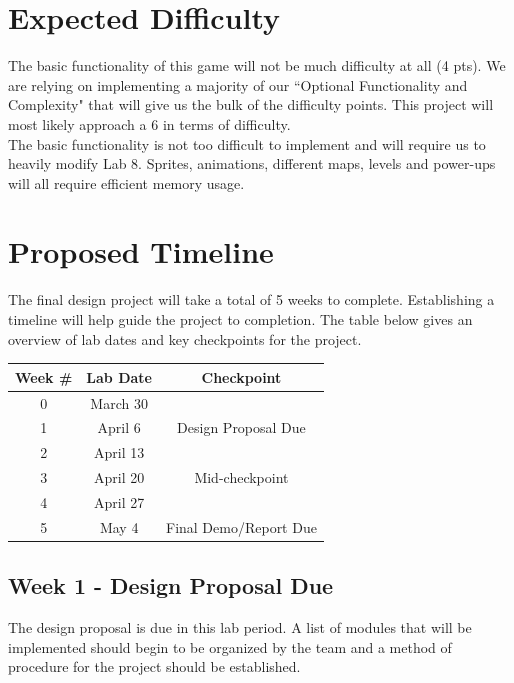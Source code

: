 \documentclass[journal, twocolumn, final,11pt,letterpaper]{IEEEtran}
\begin{document}
\section{Expected Difficulty}
The basic functionality of this game will not be much difficulty at all (4 pts). We are relying on implementing a majority of our ``Optional Functionality and Complexity" that will give us the bulk of the difficulty points. This project will most likely approach a 6 in terms of difficulty. \\

The basic functionality is not too difficult to implement and will require us to heavily modify Lab 8. Sprites, animations, different maps, levels and power-ups will all require efficient memory usage. 

\section{Proposed Timeline} 
The final design project will take a total of 5 weeks to complete. Establishing a timeline will help guide the project to completion.  The table below gives an overview of lab dates and key checkpoints for the project.

\begin{table}[htbp]
	\centering
	\begin{tabular}{ccc}	%
		\toprule	%
		Week \# & Lab Date & Checkpoint \\
		\midrule
		0 & March 30 & \\
		1 & April 6 & Design Proposal Due \\
		2 & April 13 & \\
		3 & April 20 & Mid-checkpoint \\
		4 & April 27 & \\
		5 & May 4 & Final Demo/Report Due \\
		
		\bottomrule	%
	\end{tabular}%
	\label{tab:table1}	%
\end{table}%

\subsection{Week 1 - Design Proposal Due} 
The design proposal is due in this lab period.  A list of modules that will be implemented should begin to be organized by the team and a method of procedure for the project should be established.  
\end{document}
